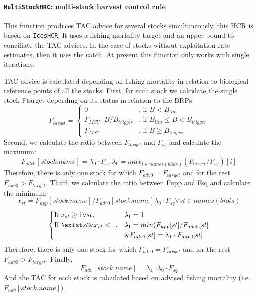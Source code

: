   \paragraph{\texttt{MultiStockHRC}: multi-stock harvest control rule} \hspace{0pt} \smallskip

  This function produces TAC advice for several stocks simultaneously, this HCR is based on \texttt{IcesHCR}. 
  It uses a fishing mortality target and an upper bound to conciliate the TAC advices. In the case of stocks without exploitation rate estimates, then it uses the catch. At present this function only works with single iterations.
  
  
  TAC advice is calculated depending on fishing mortality in relation to biological reference points of all the stocks.
  First, for each stock we calculate the single stock  Ftarget depending on its status in relation to the BRPs.
    \begin{equation}
    	F_{target} =
    	\begin{cases}
  				0                              & \text{, if } B < B_{lim} \\
  				F_{MSY} \cdot  B / B_{trigger} & \text{, if } B_{lim} \leq B < B_{trigger} \\
  				F_{MSY}                        & \text{, if } B \geq B_{trigger}
    	\end{cases}
    \end{equation}
  Second, we calculate the ratio between $F_{target}$ and $F_{sq}$ and calculate the maximum:
    \begin{equation}
    	F_{adv0}[stock.name] = \lambda_0 \cdot F_{sq} | \lambda_0 = max_{i \in names(biols)}(F_{target}/F_{sq})[i]
    \end{equation}
  Therefore, there is only one stock for which $F_{adv0} = F_{target}$ and for the rest $F_{adv0} > F_{target}$.
  Third, we calculate the ratio between Fupp and Fsq and calculate the minimum:
    \begin{equation}
    	x_{st} = F_{upp}[stock.name] /  F_{adv0}[stock.name]\lambda_0 \cdot F_{sq} \forall st \in names(biols)
    \end{equation}
    \begin{equation}
       \begin{cases}
  			  \text{If } x_{st} \geq 1 \forall st, & \lambda_1 = 1 \\
  			  \text{If } \exist st \& x_{st} < 1,  & \lambda_1 = min(F_{upp}[st]/F_{adv0}[st] \\
  			                                       & \& F_{adv1}[st] = \lambda_1 \cdot F_{adv0}[st]
    	\end{cases}
    \end{equation}
  Therefore, there is only one stock for which $F_{adv0} = F_{target}$ and for the rest $F_{adv0} > F_{target}$.
  Finally, 
    \begin{equation}
    	F_{adv}[stock.name] = \lambda_1 \cdot \lambda_0 \cdot F_{sq}
    \end{equation}
  And the TAC for each stock is calculated based on advised fishing mortality (i.e. $F_{adv}[stock.name]$).
  
